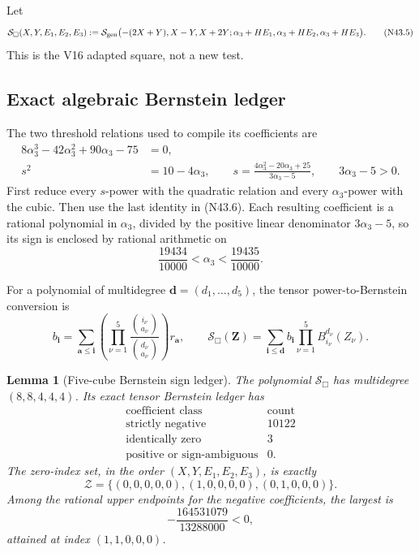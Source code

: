 \documentclass[11pt]{article}
\newtheorem{lemma}[theorem]{Lemma}
\theoremstyle{definition}
\theoremstyle{remark}
\begin{document}
Let
\[
 \mathcal S_{\Box}(X,Y,E_1,E_2,E_3)
 :=
 \mathcal S_{\rm gen}\bigl(
 -(2X+Y),X-Y,X+2Y;
 \alpha_3+HE_1,\alpha_3+HE_2,\alpha_3+HE_3
 \bigr).
\tag{N43.5}
\]
This is the V16 adapted square, not a new test.

\subsection{Exact algebraic Bernstein ledger}

The two threshold relations used to compile its coefficients are
\[
\begin{aligned}
8\alpha_3^3-42\alpha_3^2+90\alpha_3-75&=0,\\
s^2&=10-4\alpha_3,\qquad
s=\frac{4\alpha_3^2-20\alpha_3+25}{3\alpha_3-5},
\qquad 3\alpha_3-5>0.
\end{aligned}
\tag{N43.6}
\]
First reduce every \(s\)-power with the quadratic relation and every
\(\alpha_3\)-power with the cubic.  Then use the last identity in
\textup{(N43.6)}.  Each resulting coefficient is a rational polynomial
in \(\alpha_3\), divided by the positive linear denominator
\(3\alpha_3-5\), so its sign is enclosed by rational arithmetic on
\[
 \frac{19434}{10000}<\alpha_3<\frac{19435}{10000}.
\tag{N43.7}
\]

For a polynomial of multidegree
\(\bm d=(d_1,\ldots,d_5)\), the tensor power-to-Bernstein conversion is
\[
 b_{\bm i}
 =
 \sum_{\bm a\leq\bm i}
 \left(\prod_{\nu=1}^5
 \frac{\binom{i_\nu}{a_\nu}}{\binom{d_\nu}{a_\nu}}\right)
 r_{\bm a},
\qquad
 \mathcal S_{\Box}(\bm Z)=
 \sum_{\bm i\leq\bm d}b_{\bm i}
 \prod_{\nu=1}^5B_{i_\nu}^{d_\nu}(Z_\nu).
\tag{N43.8}
\]

\begin{lemma}[Five-cube Bernstein sign ledger]
\label{lem:f2v43-bernstein}
The polynomial \(\mathcal S_{\Box}\) has multidegree
\((8,8,4,4,4)\).  Its exact tensor Bernstein ledger has
\[
\begin{array}{c|r}
\text{coefficient class}&\text{count}\\ \hline
\text{strictly negative}&10122\\
\text{identically zero}&3\\
\text{positive or sign-ambiguous}&0.
\end{array}
\tag{N43.9}
\]
The zero-index set, in the order \((X,Y,E_1,E_2,E_3)\), is exactly
\[
 \mathcal Z=
 \{(0,0,0,0,0),(1,0,0,0,0),(0,1,0,0,0)\}.
\tag{N43.10}
\]
Among the rational upper endpoints for the negative coefficients, the
largest is
\[
 -\frac{164531079}{13288000}<0,
\tag{N43.11}
\]
attained at index \((1,1,0,0,0)\).
\end{lemma}
\end{document}
